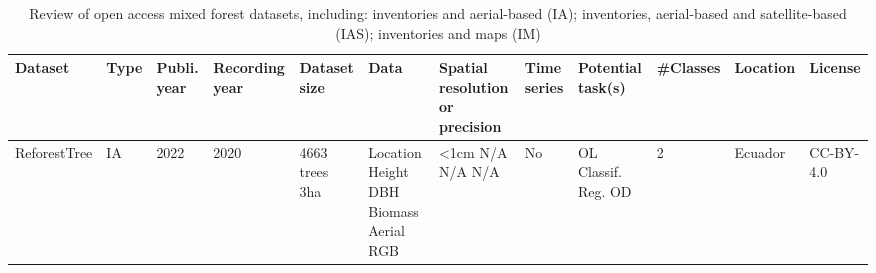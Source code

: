 \documentclass{CUP-JNL-DTM}%
\theoremstyle{definition}
\numberwithin{equation}{section}
\begin{document}
\begin{table*}[ht]
\fontsize{6.5pt}{7.5pt}\selectfont %
\renewcommand{\arraystretch}{1.5} %
\setlength\tabcolsep{5pt} %
\caption{Review of open access mixed forest datasets, including: inventories and aerial-based (IA); inventories, aerial-based and satellite-based (IAS); inventories and maps (IM)}
{\begin{fntable}
\centering
\begin{adjustwidth}{-0.8cm}{}
\begin{tabular}{p{1.4cm} | p{0.3cm} | p{0.4cm} | p{1cm} | p{1.4cm} | p{1.4cm} : p{1.5cm} | p{0.4cm} | p{0.7cm} | p{1cm} | p{1cm} | p{1.1cm}}
\toprule
Dataset  & Type & Publi. year & Recording year & Dataset size & Data  & Spatial resolution or precision & Time series & Potential task(s) & \#Classes & Location  & License  \\
\midrule


ReforestTree \cite{reiersen_reforestree_2022} & IA & 2022 & 2020 & 4663 trees \newline 3ha & Location \newline Height \newline DBH \newline Biomass \newline Aerial RGB & <1cm \newline N/A \newline N/A \newline N/A \newline 2cm & No & OL \newline Classif. \newline Reg. \newline OD & 2 & Ecuador & CC-BY-4.0 \\


\end{tabular}
\end{adjustwidth}
\end{fntable}}
\end{table*}
\end{document}
